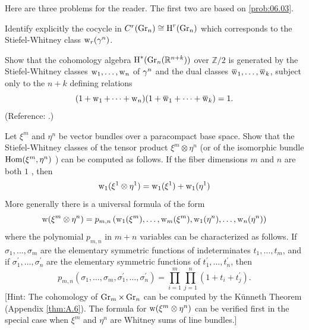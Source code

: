 \documentclass[../main]{subfiles}
\begin{document}
Here are three problems for the reader. The first two are based on \ref{prob:06.03}.

\begin{problem}
\label{prob:07.01}
Identify explicitly the cocycle in $C^{r}(\operatorname{Gr}_n) \cong \operatorname{H}^{r}(\operatorname{Gr}_n)$ which corresponds to the Stiefel-Whitney class $\operatorname{w}_{r}(\gamma^{n})$.
\end{problem}
\begin{problem}
\label{prob:07.02}
Show that the cohomology algebra $\operatorname{H}^{\ast}(\operatorname{Gr}_n(\mathbb R^{n+k}))$ over $\mathbb{Z} / 2$ is generated by the Stiefel-Whitney classes $\operatorname{w}_{1}, \dots, \operatorname{w}_{n}$ of $\gamma^{n}$ and the dual classes $\xoverline{\sw}_{1}, \dots, \xoverline{\sw}_{k}$, subject only to the $n+k$ defining relations
\[(1+\sw_{1}+\dots+\sw_{n})(1+\xoverline{\sw}_{1}+\dots+\xoverline{\sw}_{k})=1.\]
(Reference: \cite[pp. 190]{Borel1953}.)
\end{problem}
\begin{problem}
\label{prob:07.03}
Let $\xi^{m}$ and $\eta^{n}$ be vector bundles over a paracompact base space. Show that the Stiefel-Whitney classes of the tensor product $\xi^{m} \otimes \eta^{n}$ (or of the isomorphic bundle $\operatorname{Hom}(\xi^{m}, \eta^{n})$ ) can be computed as follows. If the fiber dimensions $m$ and $n$ are both $ 1 $ , then
\[\operatorname{w}_{1}(\xi^{1} \otimes \eta^{1})=\operatorname{w}_{1}(\xi^{1})+\operatorname{w}_{1}(\eta^{1})\]
More generally there is a universal formula of the form
\[\operatorname{w}(\xi^{m} \otimes \eta^{n})=p_{m, n}\left(\operatorname{w}_{1}(\xi^{m}), \dots, \operatorname{w}_{m}(\xi^{m}), \operatorname{w}_{1}(\eta^{n}), \dots, \operatorname{w}_{n}(\eta^{n})\right)\]
where the polynomial $p_{m, n}$ in $m+n$ variables can be characterized as follows. If $\sigma_{1}, \dots, \sigma_{m}$ are the elementary symmetric functions of indeterminates $t_{1}, \dots, t_{m}$, and if $\sigma_{1}^{\prime}, \dots, \sigma_{n}^{\prime}$ are the elementary symmetric functions of $t_{1}^{\prime}, \dots, t_{n}^{\prime}$, then
\[p_{m, n}(\sigma_{1}, \dots, \sigma_{m}, \sigma_{1}^{\prime}, \dots, \sigma_{n}^{\prime})=\prod_{i=1}^{m} \prod_{j=1}^{n}(1+t_{i}+t_{j}^{\prime}).	\]
[Hint: The cohomology of $\operatorname{Gr}_m \times \operatorname{Gr}_n$ can be computed by the Künneth Theorem (Appendix \ref{thm:A.6}). The formula for $\operatorname{w}(\xi^{m} \otimes \eta^{n})$ can be verified first in the special case when $\xi^{m}$ and $\eta^{n}$ are Whitney sums of line bundles.]
\end{problem}
\end{document}
